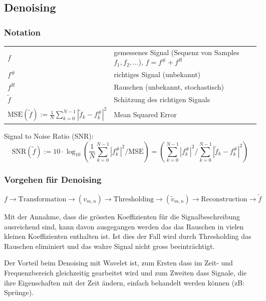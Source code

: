 \subsection{Denoising }

\subsubsection{Notation}

\begin{tabular}{ll}
	$f$ & gemessenes Signal (Sequenz von Samples $f_1, f_2,...$), $f=f^\# + f^R$ \\
	$f^\#$ & richtiges Signal (unbekannt) \\
	$f^R$ & Rauschen (unbekannt, stochastisch) \\
	$\tilde{f}$ & Schätzung des richtigen Signals \\
	$\mathrm{MSE}(\tilde{f}) := \frac{1}{N}\sum_{k=0}^{N-1}|\tilde{f}_k - f_k^{\#}|^2$ & Mean Squared Error \\
\end{tabular}

Signal to Noise Ratio (SNR):
\[
	\mathrm{SNR}(\tilde{f}):=10\cdot \log_{10} \left(\frac{1}{N}\sum_{k=0}^{N-1} |f_k^{\#}|^2 / \mathrm{MSE}\right) = \left(\sum_{k=0}^{N-1} |f_k^{\#}|^2 / \sum_{k=0}^{N-1}|\tilde{f}_k - f_k^{\#}|^2\right)
\]

\subsubsection{Vorgehen für Denoising}
\[ 
	f \longrightarrow \boxed{\mathrm{Transformation}} \longrightarrow (v_{m,n}) \longrightarrow \boxed{\mathrm{Thresholding}} \longrightarrow (\tilde{v}_{m,n}) \longrightarrow \boxed{\mathrm{Reconstruction}}\longrightarrow \tilde{f} 
\]

Mit der Annahme, dass die grössten Koeffizienten für die Signalbeschreibung ausreichend sind, kann davon ausgegangen werden das das Rauschen in vielen kleinen Koeffizienten enthalten ist. Ist dies der Fall wird durch Thresholding das Rauschen eliminiert und das wahre Signal nicht gross beeinträchtigt.

Der Vorteil beim Denoising mit Wavelet ist, zum Ersten dass im Zeit- und Frequenzbereich gleichzeitig gearbeitet wird und zum Zweiten dass Signale, die ihre Eigenschaften mit der Zeit ändern, einfach behandelt werden können (zB: Sprünge). 

\vspace{0.5cm}

